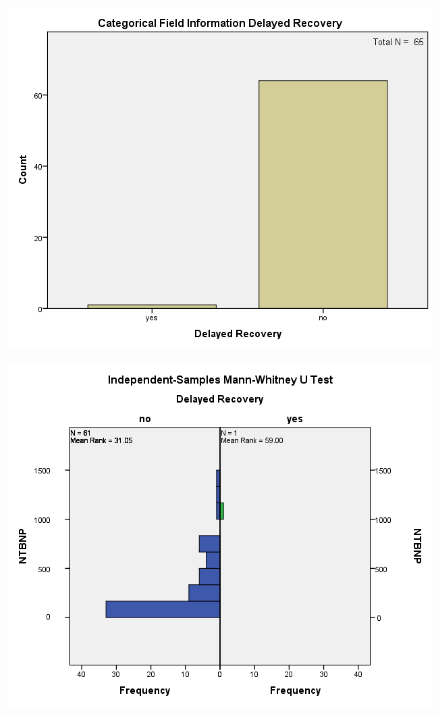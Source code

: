 \documentclass[14pt,a4paper,onecolumn]{extarticle}
\begin{document}
\clearpage
\begin{figure}
    \centering
    \includegraphics[scale=0.7]{../images/cat_recovery.png}
    \small\caption{}
    \label{}
\end{figure}

\clearpage
\begin{figure}
    \centering
    \includegraphics[scale=0.7]{../images/manwhit_recovery.png}
    \small\caption{}
    \label{}
\end{figure}
\end{document}
